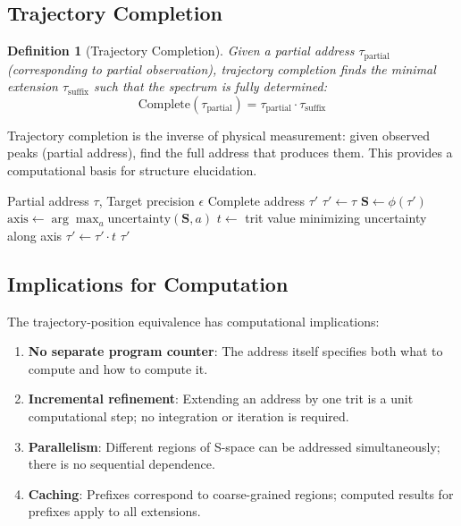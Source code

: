 \documentclass[twocolumn,10pt]{article}
\newtheorem{definition}[theorem]{Definition}
\begin{document}
\subsection{Trajectory Completion}

\begin{definition}[Trajectory Completion]
Given a partial address $\tau_{\text{partial}}$ (corresponding to partial observation), trajectory completion finds the minimal extension $\tau_{\text{suffix}}$ such that the spectrum is fully determined:
\begin{equation}
\text{Complete}(\tau_{\text{partial}}) = \tau_{\text{partial}} \cdot \tau_{\text{suffix}}
\end{equation}
\end{definition}

Trajectory completion is the inverse of physical measurement: given observed peaks (partial address), find the full address that produces them. This provides a computational basis for structure elucidation.

\begin{algorithm}[H]
\caption{Trajectory Completion}
\begin{algorithmic}[1]
\Require Partial address $\tau$, Target precision $\epsilon$
\Ensure Complete address $\tau'$
\State $\tau' \gets \tau$
    \State $\mathbf{S} \gets \phi(\tau')$
    \State $\text{axis} \gets \arg\max_a \text{uncertainty}(\mathbf{S}, a)$
    \State $t \gets $ trit value minimizing uncertainty along axis
    \State $\tau' \gets \tau' \cdot t$
\EndWhile
\State \Return $\tau'$
\end{algorithmic}
\end{algorithm}

\subsection{Implications for Computation}

The trajectory-position equivalence has computational implications:

\begin{enumerate}[leftmargin=*]
\item \textbf{No separate program counter}: The address itself specifies both what to compute and how to compute it.

\item \textbf{Incremental refinement}: Extending an address by one trit is a unit computational step; no integration or iteration is required.

\item \textbf{Parallelism}: Different regions of S-space can be addressed simultaneously; there is no sequential dependence.

\item \textbf{Caching}: Prefixes correspond to coarse-grained regions; computed results for prefixes apply to all extensions.
\end{enumerate}
\end{document}
